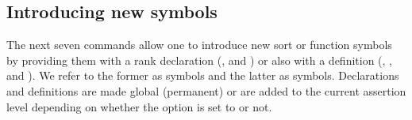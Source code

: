 \subsection{Introducing new symbols} \label{sec:new-symbols}

The next seven commands allow one to introduce new sort or function symbols 
by providing them with a rank declaration
(,  and )
or also with a definition 
(, ,  and 
).
We refer to the former as  symbols and 
the latter as  symbols.
Declarations and definitions are made global (permanent) or are added 
to the current assertion level depending on 
whether the option  is set to  or not.

